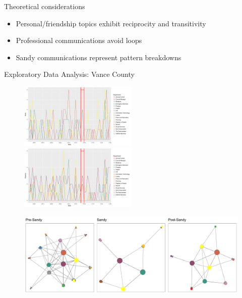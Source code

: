 \documentclass[10pt]{beamer}
\theoremstyle{definition}
\theoremstyle{remark}
\begin{document}
\begin{frame}{Theoretical considerations}
\large
\begin{itemize}
\item Personal/friendship topics exhibit reciprocity and transitivity \vspace{.4cm}
\item Professional communications avoid loops  \vspace{.4cm}
\item Sandy communications represent pattern breakdowns
\end{itemize}

\end{frame}


\begin{frame}{Exploratory Data Analysis: Vance County}
	\begin{minipage}{0.85\linewidth}
	 	 \begin{figure}
	 	 	\includegraphics[width=0.5\textwidth, trim = 0cm 0cm 5cm 0cm, clip=true]{figures/VanceSend.pdf}	 	
	 	 	\includegraphics[width=0.5\textwidth, trim = 0cm 0cm 5cm 0cm, clip=true]{figures/VanceReceive.pdf}
	 	 \end{figure}	\vspace{-.5cm}
	 \begin{figure}
	 		 	\includegraphics[width=1\textwidth]{figures/VanceNetwork.pdf}

\end{figure}
\end{minipage}
\end{frame}
\end{document}
